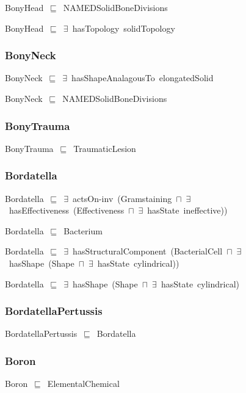 \documentclass{article}
\begin{document}
BonyHead~\ensuremath{\sqsubseteq}~NAMEDSolidBoneDivisions~

BonyHead~\ensuremath{\sqsubseteq}~\ensuremath{\exists}~hasTopology~solidTopology~

\subsubsection*{BonyNeck}

BonyNeck~\ensuremath{\sqsubseteq}~\ensuremath{\exists}~hasShapeAnalagousTo~elongatedSolid~

BonyNeck~\ensuremath{\sqsubseteq}~NAMEDSolidBoneDivisions~

\subsubsection*{BonyTrauma}

BonyTrauma~\ensuremath{\sqsubseteq}~TraumaticLesion~

\subsubsection*{Bordatella}

Bordatella~\ensuremath{\sqsubseteq}~\ensuremath{\exists}~actsOn-inv~(Gramstaining~\ensuremath{\sqcap}~\ensuremath{\exists}~hasEffectiveness~(Effectiveness~\ensuremath{\sqcap}~\ensuremath{\exists}~hasState~ineffective))~

Bordatella~\ensuremath{\sqsubseteq}~Bacterium~

Bordatella~\ensuremath{\sqsubseteq}~\ensuremath{\exists}~hasStructuralComponent~(BacterialCell~\ensuremath{\sqcap}~\ensuremath{\exists}~hasShape~(Shape~\ensuremath{\sqcap}~\ensuremath{\exists}~hasState~cylindrical))~

Bordatella~\ensuremath{\sqsubseteq}~\ensuremath{\exists}~hasShape~(Shape~\ensuremath{\sqcap}~\ensuremath{\exists}~hasState~cylindrical)~

\subsubsection*{BordatellaPertussis}

BordatellaPertussis~\ensuremath{\sqsubseteq}~Bordatella~

\subsubsection*{Boron}

Boron~\ensuremath{\sqsubseteq}~ElementalChemical~
\end{document}
